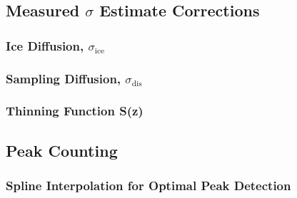 \documentclass[../../CompleteThesis/Complete_1stDraft.tex]{subfiles}
\begin{document}
\subsection{Measured $\sigma$ Estimate Corrections}
\label{Subsec:Method_FirstSigmaEstimate_Correction}


\subsubsection[Ice diffusion]{Ice Diffusion, $\sigma_{\text{ice}}$}
\label{Subsubsec:Method_FirstSigmaEstimate_Correction_IceDiffusion}

\subsubsection[Sampling diffusion]{Sampling Diffusion, $\sigma_{\text{dis}}$}
\label{Subsubsec:Method_FirstSigmaEstimate_Correction_SamplingDiffusion}


\subsubsection[Thinning Function]{Thinning Function S(z)}
\label{Subsubsec:Method_FirstSigmaEstimate_Correction_ThinningFunction}






\subsection[Peak Counting]{Peak Counting}
\label{Subsec:Method_FirstSigmaEstimate_PeakCounting}

\subsubsection[Interpolation]{Spline Interpolation for Optimal Peak Detection}
\label{Subsubsec:Method_FirstSigmaEstimate_PeakCounting_SplineInterp}
\end{document}
